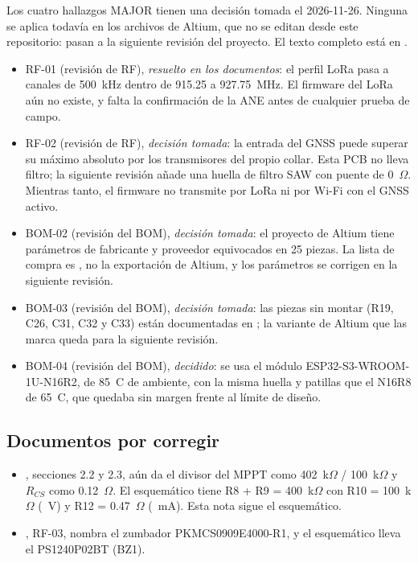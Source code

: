 Los cuatro hallazgos MAJOR tienen una decisión tomada el 2026-11-26. Ninguna se aplica todavía en los archivos de
Altium, que no se editan desde este repositorio: pasan a la siguiente revisión del proyecto.
El texto completo está en .
\begin{itemize}
  \item RF-01 (revisión de RF), \emph{resuelto en los documentos}: el perfil LoRa pasa a canales de 500~kHz dentro de 915.25 a 927.75~MHz. El firmware del LoRa aún no existe, y falta la confirmación de la ANE antes de cualquier prueba de campo.
  \item RF-02 (revisión de RF), \emph{decisión tomada}: la entrada del GNSS puede superar su máximo absoluto por los transmisores del propio collar. Esta PCB no lleva filtro; la siguiente revisión añade una huella de filtro SAW con puente de 0~$\Omega$. Mientras tanto, el firmware no transmite por LoRa ni por Wi-Fi con el GNSS activo.
  \item BOM-02 (revisión del BOM), \emph{decisión tomada}: el proyecto de Altium tiene parámetros de fabricante y proveedor equivocados en 25 piezas. La lista de compra es , no la exportación de Altium, y los parámetros se corrigen en la siguiente revisión.
  \item BOM-03 (revisión del BOM), \emph{decisión tomada}: las piezas sin montar (R19, C26, C31, C32 y C33) están documentadas en ; la variante de Altium que las marca queda para la siguiente revisión.
  \item BOM-04 (revisión del BOM), \emph{decidido}: se usa el módulo ESP32-S3-WROOM-1U-N16R2, de 85~\textdegree C de ambiente, con la misma huella y patillas que el N16R8 de 65~\textdegree C, que quedaba sin margen frente al límite de diseño.
\end{itemize}

\subsection{Documentos por corregir}

\begin{itemize}
  \item {}, secciones 2.2 y 2.3, aún da el divisor del MPPT como 402~k$\Omega$ / 100~k$\Omega$ y $R_{CS}$ como 0.12~$\Omega$. El esquemático tiene R8 + R9 = 400~k$\Omega$ con R10 = 100~k$\Omega$ (\cVmppt~V) y R12 = 0.47~$\Omega$ (\cIcs~mA). Esta nota sigue el esquemático.
  \item {}, RF-03, nombra el zumbador PKMCS0909E4000-R1, y el esquemático lleva el PS1240P02BT (BZ1).
\end{itemize}

